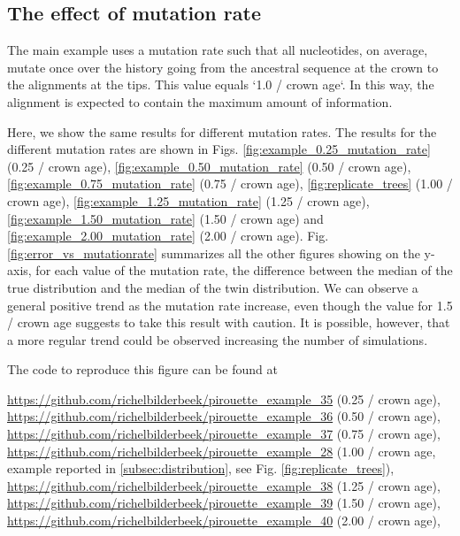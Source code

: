 \subsection{The effect of mutation rate}
\label{subsec:mutation_rate}

The main example uses a mutation rate such that all nucleotides,
on average, mutate once over the history going from the
ancestral sequence at the crown to the alignments at the tips.
This value equals `1.0 / crown age`.
In this way, the alignment is expected to contain the maximum
amount of information.

Here, we show the same results for different mutation rates.
 The results for the different mutation rates are shown in Figs. \ref{fig:example_0.25_mutation_rate} (0.25 / crown age), \ref{fig:example_0.50_mutation_rate} (0.50 / crown age), \ref{fig:example_0.75_mutation_rate} (0.75 / crown age), \ref{fig:replicate_trees} (1.00 / crown age), \ref{fig:example_1.25_mutation_rate} (1.25 / crown age),
 \ref{fig:example_1.50_mutation_rate} (1.50 / crown age) and
 \ref{fig:example_2.00_mutation_rate} (2.00 / crown age).
Fig. \ref{fig:error_vs_mutationrate} summarizes all the other figures showing on the y-axis, for each value of the mutation rate, the difference between the median of the true distribution and the median of the twin distribution. We can observe a general positive trend as the mutation rate increase, even though the value for 1.5 / crown age suggests to take this result with caution. It is possible, however, that a more regular trend could be observed increasing the number of simulations.

The code to reproduce this figure can be found at
\begin{sloppypar}
  \url{https://github.com/richelbilderbeek/pirouette_example_35} (0.25 / crown age),
  \url{https://github.com/richelbilderbeek/pirouette_example_36} (0.50 / crown age),
  \url{https://github.com/richelbilderbeek/pirouette_example_37} (0.75 / crown age),
  \url{https://github.com/richelbilderbeek/pirouette_example_28} (1.00 / crown age, example reported in \ref{subsec:distribution}, see Fig. \ref{fig:replicate_trees}),
  \url{https://github.com/richelbilderbeek/pirouette_example_38} (1.25 / crown age),
  \url{https://github.com/richelbilderbeek/pirouette_example_39} (1.50 / crown age),
  \url{https://github.com/richelbilderbeek/pirouette_example_40} (2.00 / crown age),
\end{sloppypar}

